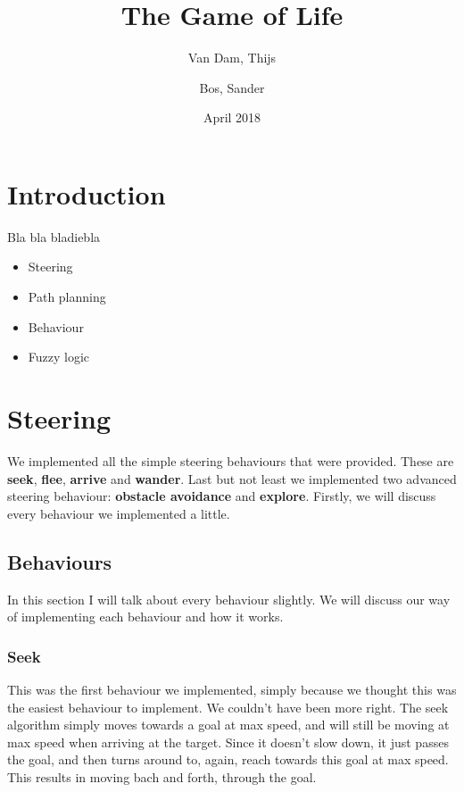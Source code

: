 \documentclass[11pt]{extarticle}
\author{Van Dam, Thijs\\
\and
Bos, Sander\\
}
\title{\huge The Game of Life}
\date{April 2018}
\begin{document}
    \maketitle
    \thispagestyle{empty}
    \newpage
    \newpage
    \setcounter{page}{1}
    \section{Introduction}\label{sec:introduction}
    Bla bla bladiebla
    \begin{itemize}
        \item Steering
        \item Path planning
        \item Behaviour
        \item Fuzzy logic
    \end{itemize}

    \newpage
    \tableofcontents
    \newpage
    \section{Steering}\label{sec:steering}
    We implemented all the simple steering behaviours that were provided.
    These are \textbf{seek}, \textbf{flee}, \textbf{arrive} and \textbf{wander}.
    Last but not least we implemented two advanced steering behaviour: \textbf{obstacle avoidance} and \textbf{explore}.
    Firstly, we will discuss every behaviour we implemented a little.

    \subsection[Describing the steering behaviours]{Behaviours}\label{subsec:behaviours}
    In this section I will talk about every behaviour slightly.
    We will discuss our way of implementing each behaviour and how it works.
    
    \subsubsection{Seek}
    This was the first behaviour we implemented, simply because we thought this was the easiest behaviour to implement.
    We couldn't have been more right.
    The seek algorithm simply moves towards a goal at max speed, and will still be moving at max speed when arriving at the target.
    Since it doesn't slow down, it just passes the goal, and then turns around to, again, reach towards this goal at max speed.
    This results in moving bach and forth, through the goal.
    
\end{document}
